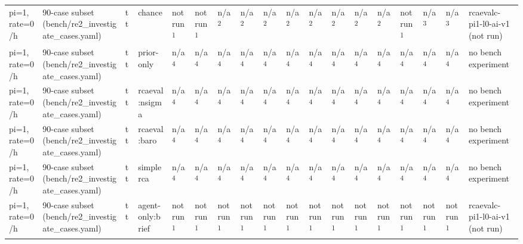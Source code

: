 \begin{table}[t]
\begin{tabular}{llllllllllllllllll}
pi=1, rate=0/h & 90-case subset (bench/re2\_investigate\_cases.yaml) & tt & chance & not run\textsuperscript{1} & not run\textsuperscript{1} & n/a\textsuperscript{2} & n/a\textsuperscript{2} & n/a\textsuperscript{2} & n/a\textsuperscript{2} & n/a\textsuperscript{2} & n/a\textsuperscript{2} & n/a\textsuperscript{2} & n/a\textsuperscript{2} & not run\textsuperscript{1} & n/a\textsuperscript{3} & n/a\textsuperscript{3} & rcaevalc-pi1-l0-ai-v1 (not run) \\
pi=1, rate=0/h & 90-case subset (bench/re2\_investigate\_cases.yaml) & tt & prior-only & n/a\textsuperscript{4} & n/a\textsuperscript{4} & n/a\textsuperscript{4} & n/a\textsuperscript{4} & n/a\textsuperscript{4} & n/a\textsuperscript{4} & n/a\textsuperscript{4} & n/a\textsuperscript{4} & n/a\textsuperscript{4} & n/a\textsuperscript{4} & n/a\textsuperscript{4} & n/a\textsuperscript{4} & n/a\textsuperscript{4} & no bench experiment \\
pi=1, rate=0/h & 90-case subset (bench/re2\_investigate\_cases.yaml) & tt & rcaeval:nsigma & n/a\textsuperscript{4} & n/a\textsuperscript{4} & n/a\textsuperscript{4} & n/a\textsuperscript{4} & n/a\textsuperscript{4} & n/a\textsuperscript{4} & n/a\textsuperscript{4} & n/a\textsuperscript{4} & n/a\textsuperscript{4} & n/a\textsuperscript{4} & n/a\textsuperscript{4} & n/a\textsuperscript{4} & n/a\textsuperscript{4} & no bench experiment \\
pi=1, rate=0/h & 90-case subset (bench/re2\_investigate\_cases.yaml) & tt & rcaeval:baro & n/a\textsuperscript{4} & n/a\textsuperscript{4} & n/a\textsuperscript{4} & n/a\textsuperscript{4} & n/a\textsuperscript{4} & n/a\textsuperscript{4} & n/a\textsuperscript{4} & n/a\textsuperscript{4} & n/a\textsuperscript{4} & n/a\textsuperscript{4} & n/a\textsuperscript{4} & n/a\textsuperscript{4} & n/a\textsuperscript{4} & no bench experiment \\
pi=1, rate=0/h & 90-case subset (bench/re2\_investigate\_cases.yaml) & tt & simplerca & n/a\textsuperscript{4} & n/a\textsuperscript{4} & n/a\textsuperscript{4} & n/a\textsuperscript{4} & n/a\textsuperscript{4} & n/a\textsuperscript{4} & n/a\textsuperscript{4} & n/a\textsuperscript{4} & n/a\textsuperscript{4} & n/a\textsuperscript{4} & n/a\textsuperscript{4} & n/a\textsuperscript{4} & n/a\textsuperscript{4} & no bench experiment \\
pi=1, rate=0/h & 90-case subset (bench/re2\_investigate\_cases.yaml) & tt & agent-only:brief & not run\textsuperscript{1} & not run\textsuperscript{1} & not run\textsuperscript{1} & not run\textsuperscript{1} & not run\textsuperscript{1} & not run\textsuperscript{1} & not run\textsuperscript{1} & not run\textsuperscript{1} & not run\textsuperscript{1} & not run\textsuperscript{1} & not run\textsuperscript{1} & not run\textsuperscript{1} & not run\textsuperscript{1} & rcaevalc-pi1-l0-ai-v1 (not run) \\

\end{tabular}
\end{table}
